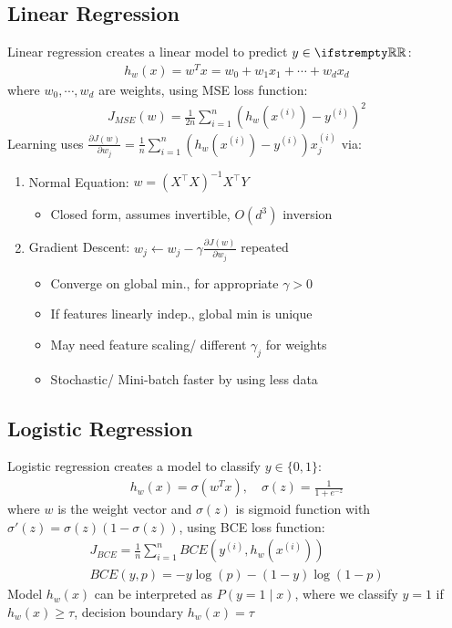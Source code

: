 \documentclass[12pt, a4paper]{article}
\begin{document}
\begin{multicols*}{3}
\subsection{Linear Regression}
Linear regression creates a linear model to predict $y \in \RR$:
\begin{align*}
  h_w(x)= w^Tx = w_0 + w_1x_1 + \cdots + w_dx_d
\end{align*}
where $w_0, \cdots, w_d$ are weights, using MSE loss function:
\begin{align*}
  J_{MSE}(w) = \frac{1}{2n}\sum^n_{i=1}(h_w(x^{(i)}) - y^{(i)})^2
\end{align*}
Learning uses $\frac{\partial J(w)}{\partial w_j} = \frac{1}{n}\sum^n_{i=1}(h_w(x^{(i)}) - y^{(i)})x_j^{(i)}$ via:
\begin{enumerate}[\roman*.]
  \item Normal Equation: $w = (X^{\top}X)^{-1}X^{\top}Y$
    \begin{itemize}[leftmargin=*]\vspace{3pt}
      \item Closed form, assumes invertible, $O(d^3)$ inversion
    \end{itemize}
  \item Gradient Descent: $w_j \leftarrow w_j - \gamma \frac{\partial J(w)}{\partial w_j}$ repeated
    \begin{itemize}[leftmargin=*]\vspace{3pt}
      \item Converge on global min., for appropriate $\gamma > 0$ 
      \item If features linearly indep., global min is unique
      \item May need feature scaling/ different $\gamma_j$ for weights
      \item Stochastic/ Mini-batch faster by using less data
    \end{itemize}
\end{enumerate}

\subsection{Logistic Regression}
Logistic regression creates a model to classify $y \in \{0,1\}$:
\begin{align*}
  h_w(x) = \sigma(w^Tx),\quad \sigma(z) = \frac{1}{1+e^{-z}}
\end{align*}
where $w$ is the weight vector and $\sigma(z)$ is sigmoid function with $\sigma'(z) = \sigma(z)(1-\sigma(z))$, using BCE loss function:
\begin{gather*}
  J_{BCE} = \frac{1}{n}\sum^n_{i=1}BCE(y^{(i)}, h_w(x^{(i)}))\\
  BCE(y, p) = -y\log(p) - (1-y)\log(1-p)
\end{gather*}
Model $h_w(x)$ can be interpreted as $P(y=1\mid x)$, where we classify $y=1$ if $h_w(x) \geq \tau$, decision boundary $h_w(x) = \tau$


\end{multicols*}
\end{document}
